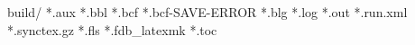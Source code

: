 build/
*.aux
*.bbl
*.bcf
*.bcf-SAVE-ERROR
*.blg
*.log
*.out
*.run.xml
*.synctex.gz
*.fls
*.fdb_latexmk
*.toc

